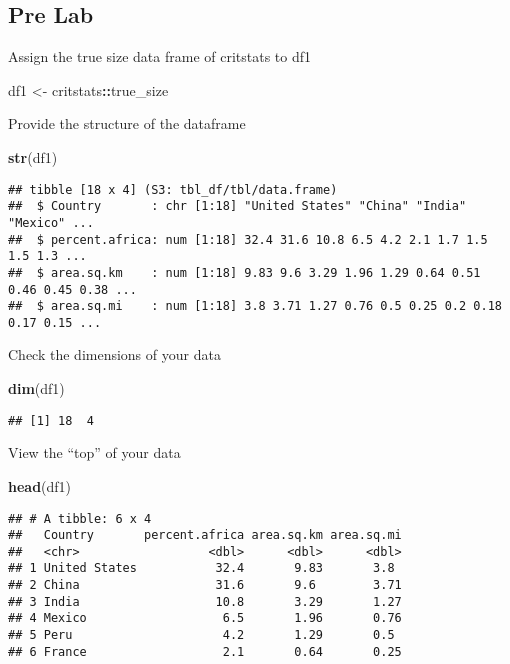 \documentclass[
]{article}
\newenvironment{Shaded}{\begin{snugshade}}{\end{snugshade}}
\newcommand{\FunctionTok}[1]{\textcolor[rgb]{0.13,0.29,0.53}{\textbf{#1}}}
\newcommand{\NormalTok}[1]{#1}
\newcommand{\OtherTok}[1]{\textcolor[rgb]{0.56,0.35,0.01}{#1}}
\newcommand{\SpecialCharTok}[1]{\textcolor[rgb]{0.81,0.36,0.00}{\textbf{#1}}}
\begin{document}
\subsection{Pre Lab}\label{pre-lab}

Assign the true size data frame of critstats to df1

\begin{Shaded}
\begin{Highlighting}[]
\NormalTok{df1 }\OtherTok{\textless{}{-}}\NormalTok{ critstats}\SpecialCharTok{::}\NormalTok{true\_size}
\end{Highlighting}
\end{Shaded}

Provide the structure of the dataframe

\begin{Shaded}
\begin{Highlighting}[]
\FunctionTok{str}\NormalTok{(df1)}
\end{Highlighting}
\end{Shaded}

\begin{verbatim}
## tibble [18 x 4] (S3: tbl_df/tbl/data.frame)
##  $ Country       : chr [1:18] "United States" "China" "India" "Mexico" ...
##  $ percent.africa: num [1:18] 32.4 31.6 10.8 6.5 4.2 2.1 1.7 1.5 1.5 1.3 ...
##  $ area.sq.km    : num [1:18] 9.83 9.6 3.29 1.96 1.29 0.64 0.51 0.46 0.45 0.38 ...
##  $ area.sq.mi    : num [1:18] 3.8 3.71 1.27 0.76 0.5 0.25 0.2 0.18 0.17 0.15 ...
\end{verbatim}

Check the dimensions of your data

\begin{Shaded}
\begin{Highlighting}[]
\FunctionTok{dim}\NormalTok{(df1)}
\end{Highlighting}
\end{Shaded}

\begin{verbatim}
## [1] 18  4
\end{verbatim}

View the ``top'' of your data

\begin{Shaded}
\begin{Highlighting}[]
\FunctionTok{head}\NormalTok{(df1)}
\end{Highlighting}
\end{Shaded}

\begin{verbatim}
## # A tibble: 6 x 4
##   Country       percent.africa area.sq.km area.sq.mi
##   <chr>                  <dbl>      <dbl>      <dbl>
## 1 United States           32.4       9.83       3.8 
## 2 China                   31.6       9.6        3.71
## 3 India                   10.8       3.29       1.27
## 4 Mexico                   6.5       1.96       0.76
## 5 Peru                     4.2       1.29       0.5 
## 6 France                   2.1       0.64       0.25
\end{verbatim}
\end{document}
